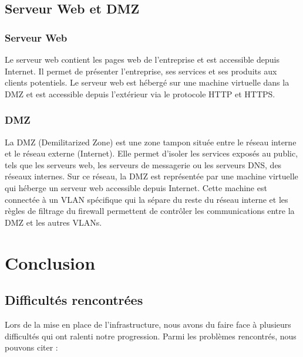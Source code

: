 \documentclass[a4paper,12pt,openany]{report}
\begin{document}
        \section{Serveur Web et DMZ}
            \subsection{Serveur Web}
                Le serveur web contient les pages web de l'entreprise et est accessible depuis Internet. Il permet de présenter l'entreprise, ses services et ses produits aux clients potentiels. Le serveur web est hébergé sur une machine virtuelle dans la DMZ et est accessible depuis l'extérieur via le protocole HTTP et HTTPS.
            \subsection{DMZ}
                La DMZ (Demilitarized Zone) est une zone tampon située entre le réseau interne et le réseau externe (Internet). Elle permet d'isoler les services exposés au public, tels que les serveurs web, les serveurs de messagerie ou les serveurs DNS, des réseaux internes. Sur ce réseau, la DMZ est représentée par une machine virtuelle qui héberge un serveur web accessible depuis Internet. Cette machine est connectée à un VLAN spécifique qui la sépare du reste du réseau interne et les règles de filtrage du firewall permettent de contrôler les communications entre la DMZ et les autres VLANs.
    \chapter{Conclusion}
        \section{Difficultés rencontrées}

            Lors de la mise en place de l'infrastructure, nous avons du faire face à plusieurs difficultés qui ont ralenti notre progression. Parmi les problèmes rencontrés, nous pouvons citer :
\end{document}
